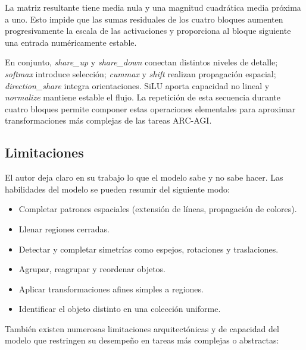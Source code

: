 \documentclass[11pt,a4paper,spanish]{book}
\numberwithin{equation}{chapter}
\numberwithin{figure}{chapter}
\begin{document}
La matriz resultante tiene media nula y una magnitud cuadrática media próxima a uno. Esto impide que las sumas residuales de los cuatro
bloques aumenten progresivamente la escala de las activaciones y proporciona al bloque siguiente una entrada numéricamente estable.

En conjunto, \textit{share\_up} y \textit{share\_down} conectan distintos niveles de detalle; \textit{softmax} introduce selección;
\textit{cummax} y \textit{shift} realizan propagación espacial; \textit{direction\_share} integra orientaciones. SiLU
aporta capacidad no lineal y \textit{normalize} mantiene estable el flujo. La repetición de esta secuencia durante cuatro bloques
permite componer estas operaciones elementales para aproximar transformaciones más complejas de las tareas ARC-AGI.



\subsection{Limitaciones}

El autor \citeauthor{liao2025arcagiwithoutpretraining} \citeyear{liao2025arcagiwithoutpretraining} deja claro en su trabajo lo que el modelo sabe y
no sabe hacer. Las habilidades del modelo se pueden resumir del siguiente modo:

\begin{itemize}
	\item Completar patrones espaciales (extensión de líneas, propagación de colores).
	\item Llenar regiones cerradas.
	\item Detectar y completar simetrías como espejos, rotaciones y traslaciones.
	\item Agrupar, reagrupar y reordenar objetos.
	\item Aplicar transformaciones afines simples a regiones.
	\item Identificar el objeto distinto en una colección uniforme.
\end{itemize}

También existen numerosas limitaciones arquitectónicas y de capacidad del modelo que restringen su desempeño en tareas más complejas o abstractas:
\end{document}
